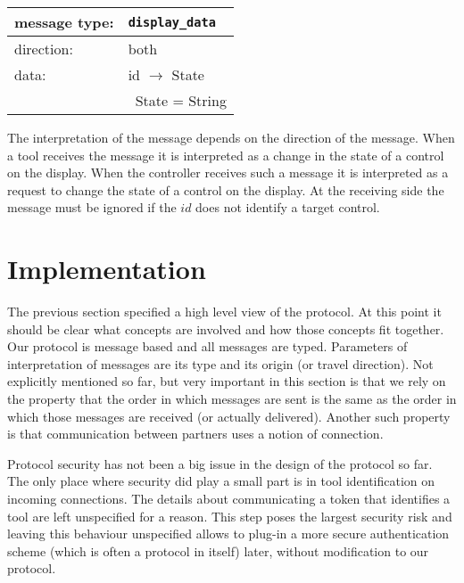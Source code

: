 \documentclass{article}
\newcommand{\msg}[1]{\texttt{#1}}
\begin{document}
   \begin{table}[H]
    \begin{center}
     \begin{tabular}{|ll|}
      \hline
       message type:   & \msg{display\_data} \\
      \hline
       direction:      & both \\
       data:           & id $\rightarrow$ State \\
                       & \ State = String \\
      \hline
     \end{tabular}
    \end{center}
   \vspace{-0.4cm}
   \end{table}

   \noindent The interpretation of the message depends on the direction of the
   message. When a tool receives the message it is interpreted as a change in
   the state of a control on the display. When the controller receives such a
   message it is interpreted as a request to change the state of a control on
   the display. At the receiving side the message must be ignored if the $id$
   does not identify a target control.

\pagebreak
 \section{Implementation} \label{s:protocol_implementation}

   The previous section specified a high level view of the protocol. At this
   point it should be clear what concepts are involved and how those concepts
   fit together. Our protocol is message based and all messages are typed.
   Parameters of interpretation of messages are its type and its origin (or
   travel direction). Not explicitly mentioned so far, but very important in
   this section is that we rely on the property that the order in which
   messages are sent is the same as the order in which those messages are
   received (or actually delivered). Another such property is that
   communication between partners uses a notion of connection.
   
   Protocol security has not been a big issue in the design of the protocol so
   far. The only place where security did play a small part is in tool
   identification on incoming connections. The details about communicating a
   token that identifies a tool are left unspecified for a reason. This step
   poses the largest security risk and leaving this behaviour unspecified
   allows to plug-in a more secure authentication scheme (which is often a
   protocol in itself) later, without modification to our protocol.
\end{document}
